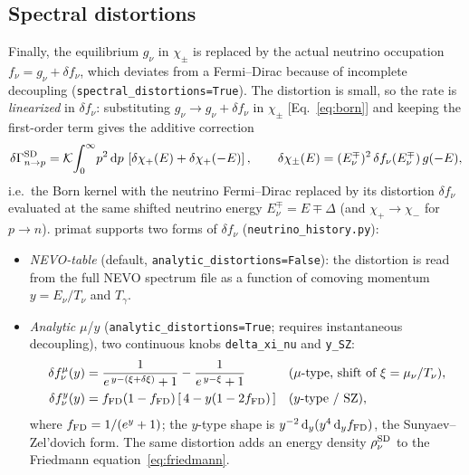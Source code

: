 \documentclass[11pt,a4paper]{article}
\newcommand{\dd}{\mathrm{d}}
\newcommand{\Tg}{T_\gamma}
\newcommand{\code}[1]{\texttt{#1}}
\newcommand{\Gap}{\Delta}
\newcommand{\Kw}{\mathcal{K}}
\begin{document}
\subsection*{Spectral distortions}
Finally, the equilibrium $g_\nu$ in $\chi_\pm$ is replaced by the actual neutrino
occupation $f_\nu=g_\nu+\delta f_\nu$, which deviates from a Fermi--Dirac because
of incomplete decoupling (\code{spectral\_distortions=True}). The distortion is
small, so the rate is \emph{linearized} in $\delta f_\nu$: substituting
$g_\nu\to g_\nu+\delta f_\nu$ in $\chi_\pm$ [Eq.~\eqref{eq:born}] and keeping the
first-order term gives the additive correction
\begin{equation}
  \delta\Gamma^{\rm SD}_{n\to p}=\Kw\!\int_0^\infty\! p^2\,\dd p\,
    \left[\delta\chi_+(E)+\delta\chi_+(-E)\right],
  \qquad
  \delta\chi_\pm(E)=(E_\nu^\mp)^2\,\delta f_\nu(E_\nu^\mp)\,g(-E),
\end{equation}
i.e.\ the Born kernel with the neutrino Fermi--Dirac replaced by its distortion
$\delta f_\nu$ evaluated at the same shifted neutrino energy $E_\nu^\mp=E\mp\Gap$
(and $\chi_+\to\chi_-$ for $p\to n$). primat supports two forms of
$\delta f_\nu$ (\code{neutrino\_history.py}):
\begin{itemize}\itemsep2pt
  \item \emph{NEVO-table} (default, \code{analytic\_distortions=False}): the
    distortion is read from the full NEVO spectrum file as a function of comoving
    momentum $y=E_\nu/T_\nu$ and $\Tg$.
  \item \emph{Analytic} $\mu$/$y$ (\code{analytic\_distortions=True}; requires
    instantaneous decoupling), two continuous knobs \code{delta\_xi\_nu} and
    \code{y\_SZ}:
    \begin{align}
      \delta f^\mu_\nu(y) &= \frac{1}{e^{\,y-(\xi+\delta\xi)}+1}-\frac{1}{e^{\,y-\xi}+1}
        && (\mu\text{-type, shift of }\xi=\mu_\nu/T_\nu),\\
      \delta f^y_\nu(y) &= f_{\rm FD}(1-f_{\rm FD})\,[\,4-y(1-2f_{\rm FD})\,]
        && (y\text{-type / SZ}),
    \end{align}
    where $f_{\rm FD}=1/(e^y+1)$; the $y$-type shape is
    $y^{-2}\,\dd_y(y^4\,\dd_y f_{\rm FD})$, the Sunyaev--Zel'dovich form. The same
    distortion adds an energy density $\rho_\nu^{\rm SD}$ to the Friedmann
    equation~\eqref{eq:friedmann}.
\end{itemize}

\end{document}
